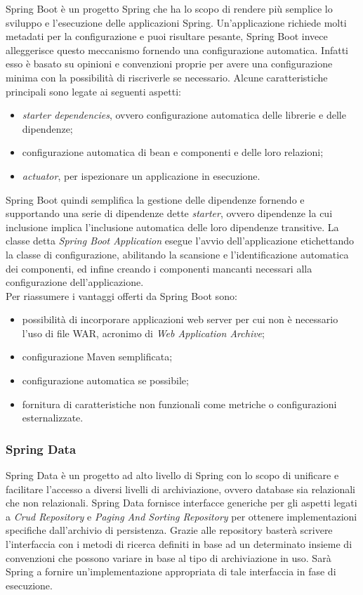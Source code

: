 Spring Boot è un progetto Spring che ha lo scopo di rendere più semplice lo sviluppo e l'esecuzione delle applicazioni Spring. Un'applicazione richiede molti metadati per la configurazione e puoi risultare pesante, Spring Boot invece alleggerisce questo meccanismo fornendo una configurazione automatica. Infatti esso è basato su opinioni e convenzioni proprie per avere una configurazione minima con la possibilità di riscriverle se necessario. Alcune caratteristiche principali sono legate ai seguenti aspetti:
\begin{itemize}
	\item \textit{starter dependencies}, ovvero configurazione automatica delle librerie e delle dipendenze;
	\item configurazione automatica di bean e componenti e delle loro relazioni;
	\item \textit{actuator}, per ispezionare un applicazione in esecuzione.
\end{itemize} 
Spring Boot quindi semplifica la gestione delle dipendenze fornendo e supportando una serie di dipendenze dette \textit{starter}, ovvero dipendenze la cui inclusione implica l'inclusione automatica delle loro dipendenze transitive. La classe detta \textit{Spring Boot Application} esegue l'avvio dell'applicazione etichettando la classe di configurazione, abilitando la scansione e l'identificazione automatica dei componenti, ed infine creando i componenti mancanti necessari alla configurazione dell'applicazione.\\
Per riassumere i vantaggi offerti da Spring Boot sono:
\begin{itemize}
	\item possibilità di incorporare applicazioni web server per cui non è necessario l'uso di file WAR, acronimo di \textit{Web Application Archive};
	\item configurazione Maven semplificata;
	\item configurazione automatica se possibile;
	\item fornitura di caratteristiche non funzionali come metriche o configurazioni esternalizzate.
\end{itemize}

\subsubsection{Spring Data}
Spring Data è un progetto ad alto livello di Spring con lo scopo di unificare e facilitare l'accesso a diversi livelli di archiviazione, ovvero database sia relazionali che non relazionali. Spring Data fornisce interfacce generiche per gli aspetti legati a \textit{Crud Repository} e \textit{Paging And Sorting Repository} per ottenere implementazioni specifiche dall'archivio di persistenza. Grazie alle repository basterà scrivere l'interfaccia con i metodi di ricerca definiti in base ad un determinato insieme di convenzioni che possono variare in base al tipo di archiviazione in uso. Sarà Spring  a fornire un'implementazione appropriata di tale interfaccia in fase di esecuzione.

